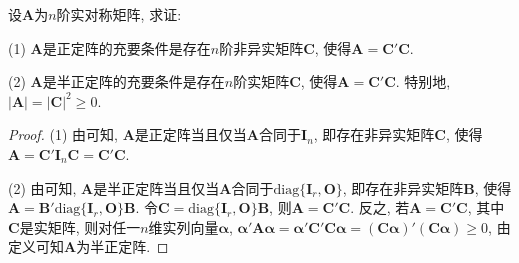 \documentclass[../../main.tex]{subfiles}
\begin{document}
\begin{proposition}[正定和半正定阵的判定准则之一]\label{proposition:正定和半正定阵的判定准则}
设$\boldsymbol{A}$为$n$阶实对称矩阵, 求证:

(1) $\boldsymbol{A}$是正定阵的充要条件是存在$n$阶非异实矩阵$\boldsymbol{C}$, 使得$\boldsymbol{A}=\boldsymbol{C}'\boldsymbol{C}$.

(2) $\boldsymbol{A}$是半正定阵的充要条件是存在$n$阶实矩阵$\boldsymbol{C}$, 使得$\boldsymbol{A}=\boldsymbol{C}'\boldsymbol{C}$. 特别地, $|\boldsymbol{A}| = |\boldsymbol{C}|^2\geq 0$.
\end{proposition}
\begin{proof}
(1) 由可知, $\boldsymbol{A}$是正定阵当且仅当$\boldsymbol{A}$合同于$\boldsymbol{I}_n$, 即存在非异实矩阵$\boldsymbol{C}$, 使得$\boldsymbol{A}=\boldsymbol{C}'\boldsymbol{I}_n\boldsymbol{C}=\boldsymbol{C}'\boldsymbol{C}$.

(2) 由可知, $\boldsymbol{A}$是半正定阵当且仅当$\boldsymbol{A}$合同于$\text{diag}\{\boldsymbol{I}_r, \boldsymbol{O}\}$, 即存在非异实矩阵$\boldsymbol{B}$, 使得$\boldsymbol{A}=\boldsymbol{B}'\text{diag}\{\boldsymbol{I}_r, \boldsymbol{O}\}\boldsymbol{B}$. 令$\boldsymbol{C}=\text{diag}\{\boldsymbol{I}_r, \boldsymbol{O}\}\boldsymbol{B}$, 则$\boldsymbol{A}=\boldsymbol{C}'\boldsymbol{C}$. 反之, 若$\boldsymbol{A}=\boldsymbol{C}'\boldsymbol{C}$, 其中$\boldsymbol{C}$是实矩阵, 则对任一$n$维实列向量$\boldsymbol{\alpha}$, $\boldsymbol{\alpha}'\boldsymbol{A}\boldsymbol{\alpha}=\boldsymbol{\alpha}'\boldsymbol{C}'\boldsymbol{C}\boldsymbol{\alpha}=(\boldsymbol{C}\boldsymbol{\alpha})'(\boldsymbol{C}\boldsymbol{\alpha})\geq 0$, 由定义可知$\boldsymbol{A}$为半正定阵.
\end{proof}
\end{document}
